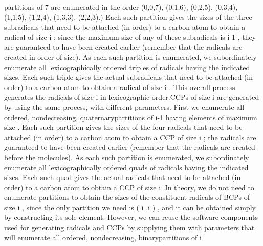 partitions of 7 are enumerated in the order (0,0,7), (0,1,6), (0,2,5),
(0,3,4), (1,1,5), (1,2,4), (1,3,3), (2,2,3).) Each such partition
gives the sizes of the three subradicals that need to be attached
(in order) to a carbon atom to obtain a radical of size %
\InlEqn[]\LmthEqn[]i
\LmthEndeqn[]\EndInlEqn[]; since the maximum size of any of these subradicals
is \InlEqn[]\LmthEqn[]i-1
\LmthEndeqn[]\EndInlEqn[], they are guaranteed to have been created
earlier (remember that the radicals are created in order of size).
As each such partition is enumerated, we subordinately enumerate all
lexicographically ordered triples of radicals having the indicated
sizes. Each such triple gives the actual subradicals that need to
be attached (in order) to a carbon atom to obtain a radical of size
\InlEqn[]\LmthEqn[]i
\LmthEndeqn[]\EndInlEqn[]. This overall process generates the radicals
of size \InlEqn[]\LmthEqn[]i
\LmthEndeqn[]\EndInlEqn[] in lexicographic order.\Endpara[]
\Para[]CCPs of size \InlEqn[]\LmthEqn[]i
\LmthEndeqn[]\EndInlEqn[] are generated by using the
same process, with different parameters. First we enumerate all ordered,
nondecreasing, \txtxemph[]quaternary\txtxendemph[] partitions of %
\InlEqn[]\LmthEqn[]i-1
\LmthEndeqn[]\EndInlEqn[] having elements of maximum size \InlEqn[]\LmthEqn[]
\left{}
\right\rfloor 
\LmthEndeqn[]%
\EndInlEqn[]. Each such partition gives the sizes of the four radicals
that need to be attached (in order) to a carbon atom to obtain a CCP
of size \InlEqn[]\LmthEqn[]i
\LmthEndeqn[]\EndInlEqn[]; the radicals are guaranteed to have
been created earlier (remember that the radicals are created before
the molecules). As each such partition is enumerated, we subordinately
enumerate all lexicographically ordered quads of radicals having the
indicated sizes. Each such quad gives the actual radicals that need
to be attached (in order) to a carbon atom to obtain a CCP of size
\InlEqn[]\LmthEqn[]i
\LmthEndeqn[]\EndInlEqn[].\Endpara[]
\Para[]In theory, we do not need to enumerate partitions to obtain
the sizes of the constituent radicals of BCPs of size \InlEqn[]\LmthEqn[]i
\LmthEndeqn[]%
\EndInlEqn[], since the only partition we need is \InlEqn[]\LmthEqn[]
\left( {{{i} },{{i} }}
\right) 
\LmthEndeqn[]%
\EndInlEqn[], and it can be obtained simply by constructing its sole
element. However, we can reuse the software components used for generating
radicals and CCPs by supplying them with parameters that will enumerate
all ordered, nondecreasing, \txtxemph[]binary\txtxendemph[] partitions
of \InlEqn[]\LmthEqn[]i
